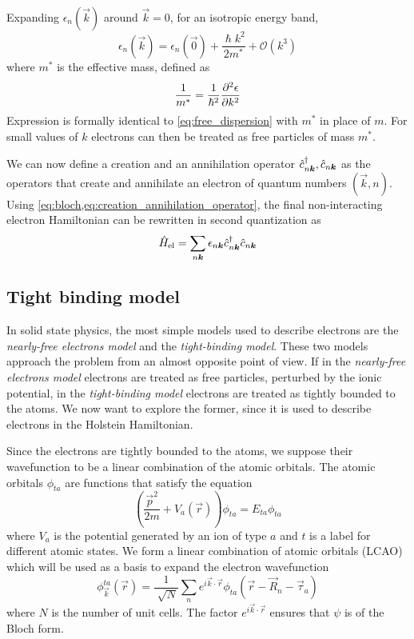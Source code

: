Expanding $\epsilon_n(\vec{k})$ around $\vec{k} = 0$, for an isotropic energy band,
\begin{equation} \label{eq:effective_mass}
    \epsilon_n(\vec{k}) = \epsilon_n(\vec{0}) + \frac{\hslash k^2}{2m^*} + \mathcal{O}(k^3)
\end{equation}
where $m^*$ is the effective mass, defined as
\begin{equation}
    \frac{1}{m^*} = \frac{1}{\hslash^2} \pdv[2]{\epsilon}{k}
\end{equation}
Expression  is formally identical to \cref{eq:free_dispersion} with $m^*$ in place of $m$. For small values of $k$ electrons can then be treated as free particles of mass $m^*$.

We can now define a creation and an annihilation operator $\hat{c}^\dagger_{n\mathbf{\boldsymbol{k}}}, \hat{c}_{n\mathbf{\boldsymbol{k}}}$ as the operators that create and annihilate an electron of quantum numbers $(\vec{k},n)$. Using \cref{eq:bloch,eq:creation_annihilation_operator}, the final non-interacting electron Hamiltonian can be rewritten in second quantization as
\begin{equation}\label{eq:electron_hamiltonian}
    \hat{H}_\text{el} = \sum_{n\mathbf{\boldsymbol{k}}} \epsilon_{n\mathbf{\boldsymbol{k}}} \hat{c}^\dagger_{n\mathbf{\boldsymbol{k}}}\hat{c}_{n\mathbf{\boldsymbol{k}}}
\end{equation}

\subsection{Tight binding model} \label{sec:tight-binding}
In solid state physics, the most simple models used to describe electrons are the \emph{nearly-free electrons model} and the \emph{tight-binding model}. These two models approach the problem from an almost opposite point of view. If in the \emph{nearly-free electrons model} electrons are treated as free particles, perturbed by the ionic potential, in the \emph{tight-binding model} electrons are treated as tightly bounded to the atoms. We now want to explore the former, since it is used to describe electrons in the Holstein Hamiltonian.

Since the electrons are tightly bounded to the atoms, we suppose their wavefunction to be a linear combination of the atomic orbitals. The atomic orbitals $\phi_{ta}$ are functions that satisfy the equation
\begin{equation}
    \left(\frac{\vec{p}^2}{2m} + V_a(\vec{r}) \right) \phi_{ta} = E_{ta}\phi_{ta}
\end{equation}
where $V_a$ is the potential generated by an ion of type $a$ and $t$ is a label for different atomic states. We form a linear combination of atomic orbitals (LCAO) which will be used as a basis to expand the electron wavefunction
\begin{equation} \label{eq:lcao_tight}
    \phi_\vec{k}^{ta}(\vec{r}) = \frac{1}{\sqrt[]{N}}\sum_{n} e^{i\vec{k}\cdot\vec{r}}\phi_{ta}(\vec{r}-\vec{R}_n - \vec{\tau}_a)
\end{equation}
where $N$ is the number of unit cells. The factor $e^{i\vec{k}\cdot\vec{r}}$ ensures that $\psi$ is of the Bloch form.

